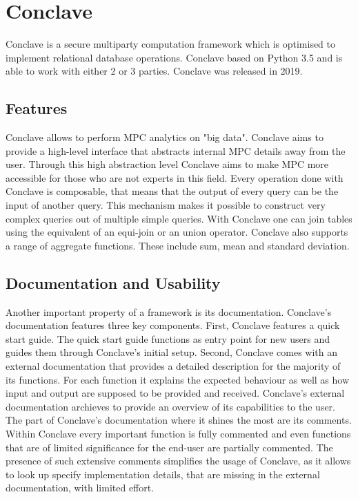 \section{Conclave}
Conclave \cite{10.1145/3302424.3303982} is a secure multiparty computation framework which is optimised to implement relational database operations. Conclave based on Python 3.5 and is able to work with either 2 or 3 parties. Conclave was released in 2019.
\subsection{Features}
 Conclave \cite{10.1145/3302424.3303982} allows to perform MPC analytics on "big data". Conclave aims to provide a high-level interface that abstracts internal MPC details away from the user. Through this high abstraction level Conclave aims to make MPC more accessible for those who are not experts in this field.  Every operation done with Conclave is composable, that means that the output of every query can be the input of another query. This mechanism makes it possible to construct very complex queries out of multiple simple queries.  With Conclave one can join tables using the equivalent of an equi-join or an union operator. Conclave also supports a range of aggregate functions. These include sum, mean and standard deviation. 
\subsection{Documentation and Usability}
Another important property of a framework is its documentation. Conclave's documentation features three key components. First, Conclave features a quick start guide. The quick start guide functions as entry point for new users and guides them through Conclave's initial setup. 
Second, Conclave comes with an external documentation that provides a detailed description for the majority of its functions. For each function it explains the expected behaviour as well as how input and output are supposed to be provided and received. Conclave's external documentation archieves to provide an overview of its capabilities to the user. 
The part of Conclave's documentation where it shines the most are its comments. Within Conclave every important function is fully commented and even functions that are of limited significance for the end-user are partially commented. The presence of such extensive comments simplifies the usage of Conclave, as it allows to look up specify implementation details, that are missing in the external documentation, with limited effort.    

